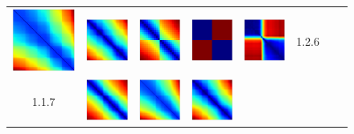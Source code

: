 \documentclass[bachelor, nocolorlinks, printoneside]{seuthesis} %
\begin{document}
\begin{Main}
\begin{figure}[ht!]
\begin{centering}
\begin{tabular}{cccc|cccc}
        \includegraphics[width=0.12\columnwidth,keepaspectratio]{figs/toyset_matrices/cluster_5by20_6_2.png} &
        \includegraphics[width=0.12\columnwidth,keepaspectratio]{figs/toyset_matrices/cluster_5by20_6_3.png} &  
        \includegraphics[width=0.12\columnwidth,keepaspectratio]{figs/toyset_matrices/cluster_2by10_6_1.png} &
        \includegraphics[width=0.12\columnwidth,keepaspectratio]{figs/toyset_matrices/cluster_2by10_6_2.png} &
        \includegraphics[width=0.12\columnwidth,keepaspectratio]{figs/toyset_matrices/cluster_2by10_6_3.png}& 1.2.6\\
        1.1.7 &\includegraphics[width=0.12\columnwidth,keepaspectratio]{figs/toyset_matrices/cluster_5by20_7_1.png} &
        \includegraphics[width=0.12\columnwidth,keepaspectratio]{figs/toyset_matrices/cluster_5by20_7_2.png} &
        \includegraphics[width=0.12\columnwidth,keepaspectratio]{figs/toyset_matrices/cluster_5by20_7_3.png} &  

\end{tabular}
\end{centering}
\end{figure}
\end{Main}
\end{document}

